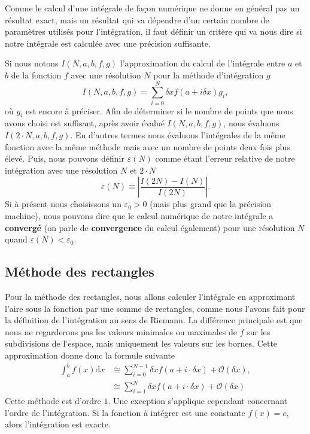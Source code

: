 \documentclass[a4paper,12pt]{book}
\newcommand{\dd}{\mathrm{d}}
\begin{document}
Comme le calcul d'une intégrale de façon numérique ne donne en général pas un résultat exact, mais
un résultat qui va dépendre d'un certain nombre de paramètres utilisés pour l'intégration, il faut
définir un critère qui va nous dire si notre intégrale est calculée avec une précision suffisante.

Si nous notons $I(N,a,b,f,g)$ l'approximation du calcul de l'intégrale entre $a$ et $b$ de la fonction $f$
avec une résolution $N$ pour la méthode d'intégration $g$
\begin{equation}
 I(N,a,b,f,g)=\sum_{i=0}^{N} \delta x f(a+i\delta x) g_i,
\end{equation}
où $g_i$ est encore à préciser. Afin de déterminer si le nombre de points que nous avons choisi est suffisant, 
après avoir évalué $I(N,a,b,f,g)$, nous évaluons $I(2\cdot N,a,b,f,g)$. En d'autres termes nous évaluons l'intégrales de la même fonction avec la même 
méthode mais avec un nombre de points deux fois plus élevé.
Puis, nous pouvons définir $\varepsilon(N)$ comme étant l'erreur relative de notre intégration avec une résolution $N$ et $2\cdot N$
\begin{equation}
 \varepsilon(N)\equiv\left|\frac{I(2N)-I(N)}{I(2N)}\right|.
\end{equation}
Si à présent nous choisissons un $\varepsilon_0>0$ (mais plus grand que la précision machine), nous pouvons dire que
le calcul numérique de notre intégrale a \textbf{convergé} (on parle de \textbf{convergence} du calcul également) pour une résolution $N$ quand $\varepsilon(N)<\varepsilon_0$.


\subsection{Méthode des rectangles}
Pour la méthode des rectangles, nous allons calculer l'intégrale en approximant l'aire sous la fonction par une somme de rectangles,
comme nous l'avons fait pour la définition de l'intégration au sens de Riemann.
La différence principale est que nous ne regarderons pas les valeurs minimales ou maximales de $f$ sur les 
subdivisions de l'espace, mais uniquement les valeurs sur les bornes. Cette approximation donne donc la formule suivante
\begin{align}
 \int_a^bf(x)\dd x&\cong\sum_{i=0}^{N-1} \delta x f(a+i\cdot\delta x)+\mathcal{O}(\delta x),\\
 &\cong\sum_{i=1}^{N} \delta x f(a+i\cdot\delta x)+\mathcal{O}(\delta x)\label{eq_rect_gauche}
\end{align}
Cette méthode est d'ordre $1$. Une exception s'applique cependant concernant l'ordre de l'intégration.
Si la fonction à intégrer est une constante $f(x)=c$, alors l'intégration est exacte.
\end{document}
